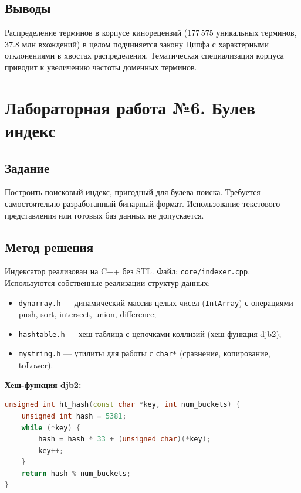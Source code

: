 \documentclass[a4paper,12pt]{article}
\begin{document}
\subsection{Выводы}

Распределение терминов в корпусе кинорецензий (177\,575 уникальных терминов, 37.8 млн вхождений) в целом подчиняется закону Ципфа с характерными отклонениями в хвостах распределения. Тематическая специализация корпуса приводит к увеличению частоты доменных терминов.


\newpage
\section{Лабораторная работа №6. Булев индекс}

\subsection{Задание}

Построить поисковый индекс, пригодный для булева поиска. Требуется самостоятельно разработанный бинарный формат. Использование текстового представления или готовых баз данных не допускается.

\subsection{Метод решения}

Индексатор реализован на C++ без STL. Файл: \texttt{core/indexer.cpp}. Используются собственные реализации структур данных:

\begin{itemize}
    \item \texttt{dynarray.h} --- динамический массив целых чисел (\texttt{IntArray}) с операциями push, sort, intersect, union, difference;
    \item \texttt{hashtable.h} --- хеш-таблица с цепочками коллизий (хеш-функция djb2);
    \item \texttt{mystring.h} --- утилиты для работы с \texttt{char*} (сравнение, копирование, toLower).
\end{itemize}

\textbf{Хеш-функция djb2:}
\begin{lstlisting}[language=C++,caption=Реализация djb2]
unsigned int ht_hash(const char *key, int num_buckets) {
    unsigned int hash = 5381;
    while (*key) {
        hash = hash * 33 + (unsigned char)(*key);
        key++;
    }
    return hash % num_buckets;
}
\end{lstlisting}
\end{document}
